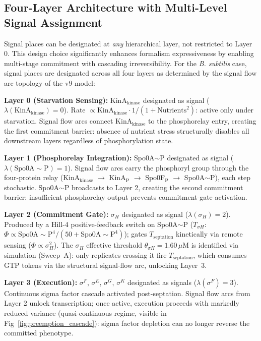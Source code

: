\documentclass[10pt,letterpaper]{article}
\begin{document}
\subsection{Four-Layer Architecture with Multi-Level Signal Assignment}\label{sec:four_layer}

Signal places can be designated at \textit{any} hierarchical layer, not restricted to Layer 0. This design choice significantly enhances formalism expressiveness by enabling multi-stage commitment with cascading irreversibility. For the \textit{B. subtilis} case, signal places are designated across all four layers as determined by the signal flow arc topology of the v9 model:

\vspace{3pt}
\noindent\textbf{Layer 0 (Starvation Sensing):} KinA$_{\text{kinase}}$ designated as signal ($\lambda(\text{KinA}_{\text{kinase}}) = 0$). Rate $\propto \text{KinA}_{\text{kinase}} \cdot 1/(1+\text{Nutrients}^2)$: active only under starvation. Signal flow arcs connect KinA$_{\text{kinase}}$ to the phosphorelay entry, creating the first commitment barrier: absence of nutrient stress structurally disables all downstream layers regardless of phosphorylation state.

\vspace{3pt}
\noindent\textbf{Layer 1 (Phosphorelay Integration):} Spo0A$\sim$P designated as signal ($\lambda(\text{Spo0A}{\sim}\text{P}) = 1$). Signal flow arcs carry the phosphoryl group through the four-protein relay (KinA$_{\text{kinase}}$ $\to$ KinA$_{\text{P}}$ $\to$ Spo0F$_{\text{P}}$ $\to$ Spo0A$\sim$P), each step stochastic. Spo0A$\sim$P broadcasts to Layer 2, creating the second commitment barrier: insufficient phosphorelay output prevents commitment-gate activation.

\vspace{3pt}
\noindent\textbf{Layer 2 (Commitment Gate):} $\sigma_H$ designated as signal ($\lambda(\sigma_H) = 2$). Produced by a Hill-4 positive-feedback switch on Spo0A$\sim$P ($T_{\sigma H}$: $\Phi \propto \text{Spo0A}{\sim}\text{P}^4 / (50 + \text{Spo0A}{\sim}\text{P}^4)$); gates $T_{\text{septation}}$ kinetically via remote sensing ($\Phi \propto \sigma_H^2$). The $\sigma_H$ effective threshold $\theta_{\sigma H} = 1.60\,\mu$M is identified via simulation (Sweep~A): only replicates crossing it fire $T_{\text{septation}}$, which consumes GTP tokens via the structural signal-flow arc, unlocking Layer~3.

\vspace{3pt}
\noindent\textbf{Layer 3 (Execution):} $\sigma^F$, $\sigma^E$, $\sigma^G$, $\sigma^K$ designated as signals ($\lambda(\sigma^F) = 3$). Continuous sigma factor cascade activated post-septation. Signal flow arcs from Layer 2 unlock transcription; once active, execution proceeds with markedly reduced variance (quasi-continuous regime, visible in Fig~\ref{fig:preemption_cascade}): sigma factor depletion can no longer reverse the committed phenotype.
\end{document}
